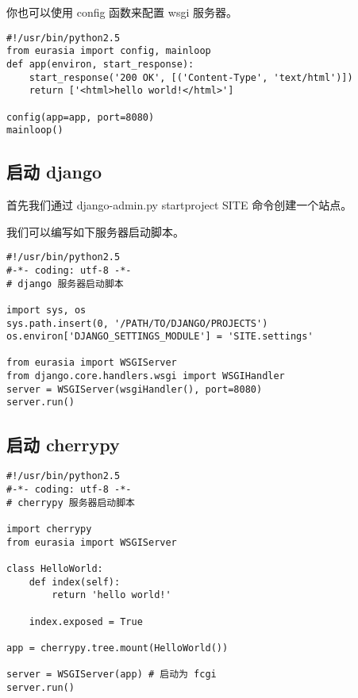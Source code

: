\documentclass{manual}
\begin{document}

你也可以使用 config 函数来配置 wsgi 服务器。

\begin{verbatim}
#!/usr/bin/python2.5
from eurasia import config, mainloop
def app(environ, start_response):
	start_response('200 OK', [('Content-Type', 'text/html')])
	return ['<html>hello world!</html>']

config(app=app, port=8080)
mainloop()
\end{verbatim}


\subsection{启动 django}

首先我们通过 django-admin.py startproject SITE 命令创建一个站点。

我们可以编写如下服务器启动脚本。

\begin{verbatim}
#!/usr/bin/python2.5
#-*- coding: utf-8 -*-
# django 服务器启动脚本

import sys, os
sys.path.insert(0, '/PATH/TO/DJANGO/PROJECTS')
os.environ['DJANGO_SETTINGS_MODULE'] = 'SITE.settings'

from eurasia import WSGIServer
from django.core.handlers.wsgi import WSGIHandler
server = WSGIServer(wsgiHandler(), port=8080)
server.run()
\end{verbatim}

\subsection{启动 cherrypy}

\begin{verbatim}
#!/usr/bin/python2.5
#-*- coding: utf-8 -*-
# cherrypy 服务器启动脚本

import cherrypy
from eurasia import WSGIServer

class HelloWorld:
	def index(self):
		return 'hello world!'

	index.exposed = True

app = cherrypy.tree.mount(HelloWorld())

server = WSGIServer(app) # 启动为 fcgi
server.run()
\end{verbatim}
\end{document}
